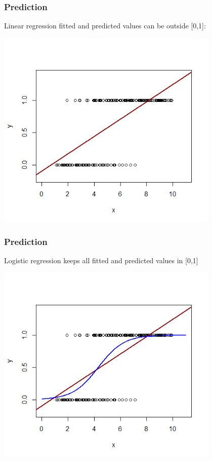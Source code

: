 \documentclass[12pt, 
hyperref={colorlinks=true, linkcolor=blue, urlcolor=cyan}]{beamer}
\begin{document}
\begin{frame}
\frametitle{Prediction}
\begin{footnotesize}
Linear regression fitted and predicted values can be outside [0,1]:\end{footnotesize}
\vspace{-0.55cm}
\center
\includegraphics[width=0.8\textwidth]{figs/scatterplot_lm}
\end{frame}

\begin{frame}
\frametitle{Prediction}
\begin{footnotesize}Logistic regression keeps all fitted and predicted values in [0,1]\end{footnotesize}
\vspace{-0.55cm}
\center
\includegraphics[width=0.8\textwidth]{figs/scatterplot_logit}
\end{frame}
\end{document}
